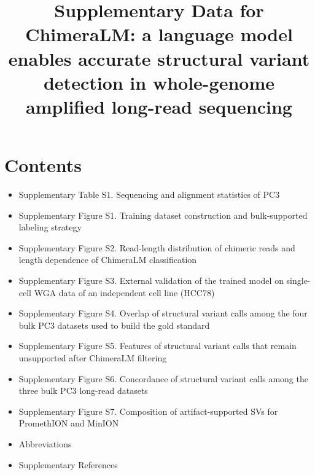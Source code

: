 \documentclass[pdflatex]{sn-jnl}%
\begin{document}
\title[Supplementary Data]{Supplementary Data for\\ChimeraLM: a language model enables accurate structural variant detection in whole-genome amplified long-read sequencing}

\author[1]{ }
\author[1]{ }
\author*[1,2]{ }


\maketitle

\glsresetall

\section*{Contents}
\begin{itemize}
	\item Supplementary Table S1. Sequencing and alignment statistics of PC3
	\item Supplementary Figure S1. Training dataset construction and bulk-supported labeling strategy
	\item Supplementary Figure S2. Read-length distribution of chimeric reads and length dependence of ChimeraLM classification
	\item Supplementary Figure S3. External validation of the trained model on single-cell WGA data of an independent cell line (HCC78)
	\item Supplementary Figure S4. Overlap of structural variant calls among the four bulk PC3 datasets used to build the gold standard
	\item Supplementary Figure S5. Features of structural variant calls that remain unsupported after ChimeraLM filtering
	\item Supplementary Figure S6. Concordance of structural variant calls among the three bulk PC3 long-read datasets
	\item Supplementary Figure S7. Composition of artifact-supported SVs for PromethION and MinION
	\item Abbreviations
	\item Supplementary References
\end{itemize}
\end{document}
